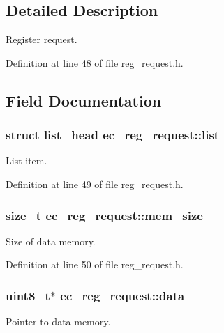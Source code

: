 \subsection{Detailed Description}
Register request. 

Definition at line 48 of file reg\-\_\-request.\-h.



\subsection{Field Documentation}
\subsubsection[{list}]{\setlength{\rightskip}{0pt plus 5cm}struct list\-\_\-head ec\-\_\-reg\-\_\-request\-::list}\label{structec__reg__request_a5b7e2c24fe669f62e8d325a3537a1aec}


List item. 



Definition at line 49 of file reg\-\_\-request.\-h.

\subsubsection[{mem\-\_\-size}]{\setlength{\rightskip}{0pt plus 5cm}size\-\_\-t ec\-\_\-reg\-\_\-request\-::mem\-\_\-size}\label{structec__reg__request_a47f808dbe3e2c0eb1931cf5215d5743f}


Size of data memory. 



Definition at line 50 of file reg\-\_\-request.\-h.

\subsubsection[{data}]{\setlength{\rightskip}{0pt plus 5cm}uint8\-\_\-t$\ast$ ec\-\_\-reg\-\_\-request\-::data}\label{structec__reg__request_a55590fb9ebef4fad289a981e5e798f29}


Pointer to data memory. 



